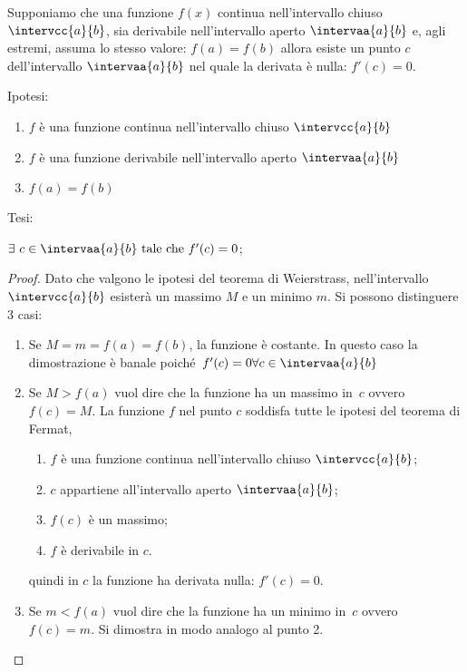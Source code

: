 \begin{teorema}
Supponiamo che una funzione \(f(x)\) continua nell'intervallo chiuso
\(\intervcc{a}{b}\),
sia derivabile nell'intervallo aperto
\(\intervaa{a}{b}\) 
e, agli estremi, assuma lo stesso valore: \(f(a) = f(b)\) allora
esiste un punto \(c\) dell'intervallo \(\intervaa{a}{b}\) nel quale 
la derivata è nulla: \(f'(c)=0\).
\end{teorema}

\noindent Ipotesi:
\begin{enumerate}[nosep]
 \item \(f\) è una funzione continua 
 nell'intervallo chiuso \(\intervcc{a}{b}\)
 \item \(f\) è una funzione derivabile 
 nell'intervallo aperto \(\intervaa{a}{b}\)
 \item \(f(a)=f(b)\)
\end{enumerate}

\noindent Tesi: 

\(\exists~c \in \intervaa{a}{b} \text{ tale che } f'(c)=0\);

\begin{proof}
Dato che valgono le ipotesi del teorema di Weierstrass, 
nell'intervallo \(\intervcc{a}{b}\) 
esisterà un massimo \(M\) e un minimo \(m\).
Si possono distinguere 3 casi:
\begin{enumerate} %
 \item Se \(M = m = f(a) = f(b)\), la funzione è costante. 
 In questo caso la dimostrazione è banale 
 poiché~\(f'(c)=0 \forall c \in \intervaa{a}{b}\)
 \item Se \(M > f(a)\) vuol dire che la funzione ha un massimo 
 in~\(c\) ovvero~\(f(c)=M\). 
 La funzione \(f\) nel punto \(c\) soddisfa tutte le ipotesi del teorema 
 di Fermat, 
\begin{enumerate}[noitemsep]
 \item \(f\) è una funzione continua nell'intervallo chiuso 
  \(\intervcc{a}{b}\);
 \item \(c\) appartiene all'intervallo aperto \(\intervaa{a}{b}\);
 \item \(f(c)\) è un massimo;
 \item \(f\) è derivabile in \(c\).
\end{enumerate}
 quindi in \(c\) la funzione ha derivata nulla: \(f'(c)=0\).
 \item Se \(m < f(a)\) vuol dire che la funzione ha un minimo 
 in~\(c\) ovvero~\(f(c)=m\).
 Si dimostra in modo analogo al punto 2.
\end{enumerate}
\end{proof}

